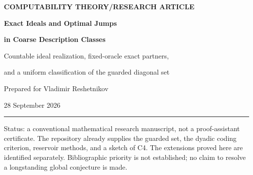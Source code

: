 \documentclass[11pt,letterpaper]{article}
\theoremstyle{definition}
\theoremstyle{remark}\newtheorem{remark}[theorem]{Remark}
\numberwithin{equation}{section}
\newcommand{\eqT}{\equiv_{\mathrm T}}
\newcommand{\equc}{\equiv_{\mathrm{uc}}}
\newcommand{\Low}{\mathcal L}
\newcommand{\TOT}{\mathrm{TOT}}
\newcommand{\Rc}{\mathcal R}
\newcommand{\Ideal}{\mathcal I}
\newcommand{\zero}{\mathbf 0}
\begin{document}
\hypersetup{pageanchor=false}
\begin{titlepage}
\vspace*{7mm}
{\sffamily\small\bfseries\color{navy}COMPUTABILITY THEORY\quad /\quad RESEARCH ARTICLE\par}
\vspace{13mm}
{\Huge\bfseries\color{navy}Exact Ideals and Optimal Jumps\par}
\vspace{4mm}
{\LARGE\bfseries\color{navy}in Coarse Description Classes\par}
\vspace{9mm}
{\large Countable ideal realization, fixed-oracle exact partners,\par
and a uniform classification of the guarded diagonal set\par}
\vspace{11mm}
{\normalsize Prepared for Vladimir Reshetnikov\par}
{\normalsize 28 September 2026\par}
\vspace{7mm}\hrule\vspace{6mm}
\begin{abstract}
A coarse description of a set agrees with it outside a set of asymptotic density zero. Its common-information core consists of the sets computed by every such description. We prove that the possible cores are exactly the countable Turing ideals, completing target C4 of the inspected ProveIt research plan. We establish a layered-reservoir theorem that simultaneously realizes a prescribed ideal as a common lower cone, avoids a fixed oracle, controls intersections of finite joins, and bounds the jump of an entire countable join. If the presentation is computable in an oracle $H$, the construction gives a join $Z$ with $(Z\oplus H)'\eqT H'$ and $\Low(Z)\cap\Low(H)=\Ideal$.

For the plan's guarded many-one complete c.e. set $X$, we prove the uniform coarse equivalence $X\equc\Rc(\TOT)$. Consequently its description spectrum is exactly $\{\mathbf d:\zero''\leq\mathbf d'\}$. Combining this classification with the reservoir construction produces descriptions $D_i\approx X$ which form minimal pairs with $\emptyset'$ and satisfy, for $Z=\bigoplus_iD_i$,
\[
             D_i'\eqT Z'\eqT(Z\oplus\emptyset')'\eqT\emptyset''.
\]
This resolves the prescribed-c.e.-set component of C6, including its residual first-jump question, with an optimal first-jump bound. The proofs distinguish relative lowness from ordinary lowness and preserve overlap when analyzing finite joins. We finish with precise remaining questions and a formalization plan.
\end{abstract}
\vfill
{\small\color{graytext}\noindent
Status: a conventional mathematical research manuscript, not a proof-assistant certificate. The repository already supplies the guarded set, the dyadic coding criterion, reservoir methods, and a sketch of C4. The extensions proved here are identified separately. Bibliographic priority is not established; no claim to resolve a longstanding global conjecture is made.}
\end{titlepage}
\hypersetup{pageanchor=true}
\tableofcontents
\end{document}
